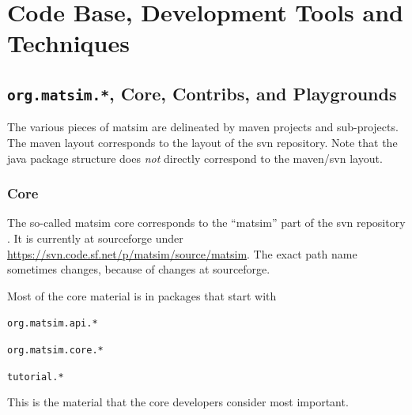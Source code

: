\section{Code Base, Development Tools and Techniques}

\subsection{\lstinline{org.matsim.*}, Core, Contribs, and Playgrounds}
The various pieces of \gls{matsim} are delineated by \gls{maven} projects and sub-projects.  The \gls{maven} layout corresponds to the layout of the \gls{svn} repository.  Note that the \gls{java} package structure does \emph{not} directly correspond to the \gls{maven}/\gls{svn} layout.

\subsubsection{Core}
The so-called \gls{matsim} core corresponds to the ``matsim'' part of the \gls{svn} repository .  It is currently at \gls{sourceforge} under \url{https://svn.code.sf.net/p/matsim/source/matsim}. The exact path name sometimes changes, \eg because of changes at \gls{sourceforge}.

Most of the core material is in packages that start with
\begin{compactitem}
\item \lstinline{org.matsim.api.*}
\item \lstinline{org.matsim.core.*}
\item \lstinline{tutorial.*}
\end{compactitem}
This is the material that the core developers consider most important. 



